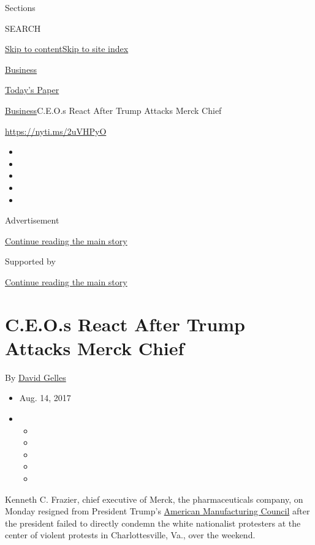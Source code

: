 Sections

SEARCH

\protect\hyperlink{site-content}{Skip to
content}\protect\hyperlink{site-index}{Skip to site index}

\href{https://www.nytimes.com/section/business}{Business}

\href{https://myaccount.nytimes.com/auth/login?response_type=cookie\&client_id=vi}{}

\href{https://www.nytimes.com/section/todayspaper}{Today's Paper}

\href{/section/business}{Business}\textbar{}C.E.O.s React After Trump
Attacks Merck Chief

\url{https://nyti.ms/2uVHPyO}

\begin{itemize}
\item
\item
\item
\item
\item
\end{itemize}

Advertisement

\protect\hyperlink{after-top}{Continue reading the main story}

Supported by

\protect\hyperlink{after-sponsor}{Continue reading the main story}

\hypertarget{ceos-react-after-trump-attacks-merck-chief}{%
\section{C.E.O.s React After Trump Attacks Merck
Chief}\label{ceos-react-after-trump-attacks-merck-chief}}

By \href{http://www.nytimes.com/by/david-gelles}{David Gelles}

\begin{itemize}
\item
  Aug. 14, 2017
\item
  \begin{itemize}
  \item
  \item
  \item
  \item
  \item
  \end{itemize}
\end{itemize}

Kenneth C. Frazier, chief executive of Merck, the pharmaceuticals
company, on Monday resigned from President Trump's
\href{https://www.whitehouse.gov/the-press-office/2017/01/27/president-trump-announces-manufacturing-jobs-initiative}{American
Manufacturing Council} after the president failed to directly condemn
the white nationalist protesters at the center of violent protests in
Charlottesville, Va., over the weekend.

